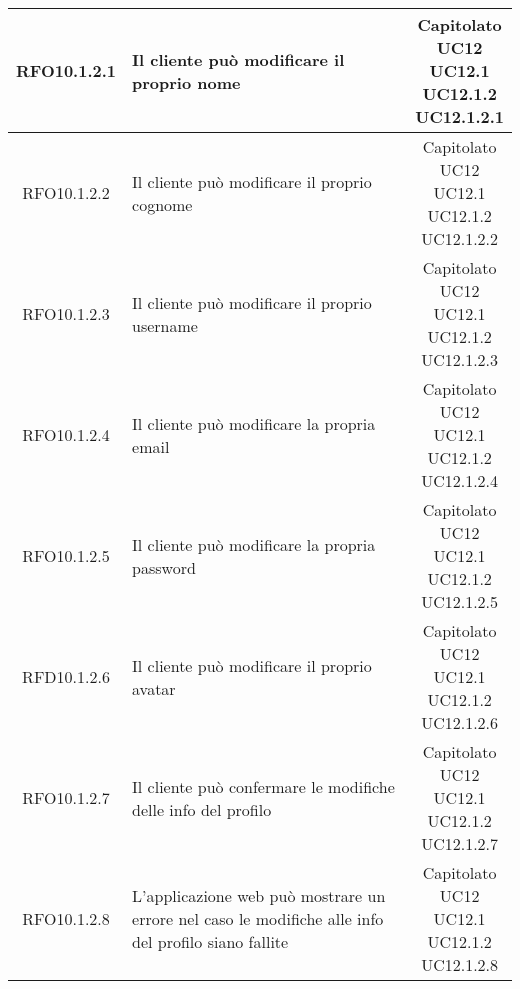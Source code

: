 \begin{longtable}{|c|p{8cm}|c|}
\hypertarget{RFO10.1.2.1}{RFO10.1.2.1} & Il cliente può modificare il proprio nome & \makecell*{Capitolato\\UC12\\UC12.1\\UC12.1.2\\UC12.1.2.1} \\
\hline
\hypertarget{RFO10.1.2.2}{RFO10.1.2.2} & Il cliente può modificare il proprio cognome & \makecell*{Capitolato\\UC12\\UC12.1\\UC12.1.2\\UC12.1.2.2} \\
\hline
\hypertarget{RFO10.1.2.3}{RFO10.1.2.3} & Il cliente può modificare il proprio username & \makecell*{Capitolato\\UC12\\UC12.1\\UC12.1.2\\UC12.1.2.3} \\
\hline
\hypertarget{RFO10.1.2.4}{RFO10.1.2.4} & Il cliente può modificare la propria email & \makecell*{Capitolato\\UC12\\UC12.1\\UC12.1.2\\UC12.1.2.4} \\
\hline
\hypertarget{RFO10.1.2.5}{RFO10.1.2.5} & Il cliente può modificare la propria password & \makecell*{Capitolato\\UC12\\UC12.1\\UC12.1.2\\UC12.1.2.5} \\
\hline
\hypertarget{RFD10.1.2.6}{RFD10.1.2.6} & Il cliente può modificare il proprio avatar & \makecell*{Capitolato\\UC12\\UC12.1\\UC12.1.2\\UC12.1.2.6} \\
\hline
\hypertarget{RFO10.1.2.7}{RFO10.1.2.7} & Il cliente può confermare le modifiche delle info del profilo & \makecell*{Capitolato\\UC12\\UC12.1\\UC12.1.2\\UC12.1.2.7} \\
\hline
\hypertarget{RFO10.1.2.8}{RFO10.1.2.8} & L'applicazione web può mostrare un errore nel caso le modifiche alle info del profilo siano fallite & \makecell*{Capitolato\\UC12\\UC12.1\\UC12.1.2\\UC12.1.2.8} \\
\hline


\end{longtable}
